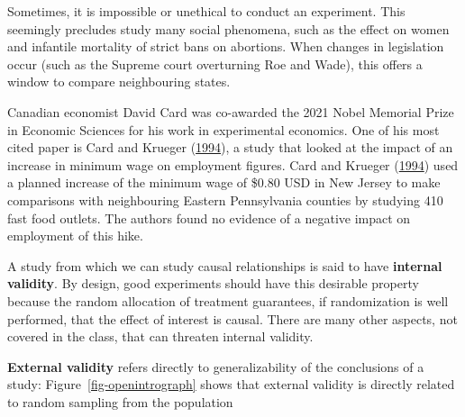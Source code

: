 \documentclass[
  11pt,
  letterpaper,
]{scrbook}
\theoremstyle{definition}
\theoremstyle{remark}
\begin{document}
\begin{tcolorbox}[enhanced jigsaw, breakable, toptitle=1mm, left=2mm, bottomrule=.15mm, colframe=quarto-callout-caution-color-frame, colback=white, rightrule=.15mm, title=\textcolor{quarto-callout-caution-color}{\faFire}\hspace{0.5em}{\textbf{Quasi experiments}}, opacityback=0, toprule=.15mm, titlerule=0mm, colbacktitle=quarto-callout-caution-color!10!white, bottomtitle=1mm, arc=.35mm, coltitle=black, opacitybacktitle=0.6, leftrule=.75mm]

Sometimes, it is impossible or unethical to conduct an experiment. This
seemingly precludes study many social phenomena, such as the effect on
women and infantile mortality of strict bans on abortions. When changes
in legislation occur (such as the Supreme court overturning Roe and
Wade), this offers a window to compare neighbouring states.

Canadian economist David Card was co-awarded the 2021 Nobel Memorial
Prize in Economic Sciences for his work in experimental economics. One
of his most cited paper is Card and Krueger
(\protect\hyperlink{ref-Card.Krueger:1994}{1994}), a study that looked
at the impact of an increase in minimum wage on employment figures. Card
and Krueger (\protect\hyperlink{ref-Card.Krueger:1994}{1994}) used a
planned increase of the minimum wage of \$0.80 USD in New Jersey to make
comparisons with neighbouring Eastern Pennsylvania counties by studying
410 fast food outlets. The authors found no evidence of a negative
impact on employment of this hike.

\end{tcolorbox}

\begin{tcolorbox}[enhanced jigsaw, breakable, toptitle=1mm, left=2mm, bottomrule=.15mm, colframe=quarto-callout-important-color-frame, colback=white, rightrule=.15mm, title=\textcolor{quarto-callout-important-color}{\faExclamation}\hspace{0.5em}{\textbf{Point of terminology: internal and external validity}}, opacityback=0, toprule=.15mm, titlerule=0mm, colbacktitle=quarto-callout-important-color!10!white, bottomtitle=1mm, arc=.35mm, coltitle=black, opacitybacktitle=0.6, leftrule=.75mm]

A study from which we can study causal relationships is said to have
\textbf{internal validity}. By design, good experiments should have this
desirable property because the random allocation of treatment
guarantees, if randomization is well performed, that the effect of
interest is causal. There are many other aspects, not covered in the
class, that can threaten internal validity.

\textbf{External validity} refers directly to generalizability of the
conclusions of a study: Figure~\ref{fig-openintrograph} shows that
external validity is directly related to random sampling from the
population

\end{tcolorbox}
\end{document}
